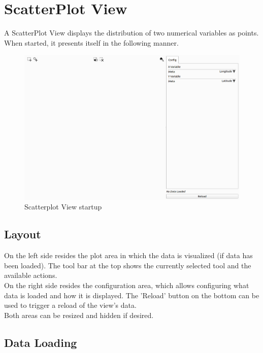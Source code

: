 \chapter{ScatterPlot View}
\label{sec:scatter_view}

A ScatterPlot View displays the distribution of two numerical variables as points. When started, it presents itself in the following manner.

\begin{figure}[H]
    \hspace*{-2cm}
    \includegraphics[width=18cm,frame]{figures/scatter_start.png}
  \caption{Scatterplot View startup}
\end{figure}

\section{Layout}

On the left side resides the plot area in which the data is visualized (if data has been loaded). The tool bar at the top shows the currently selected tool and the available actions.\\

On the right side resides the configuration area, which allows configuring what data is loaded and how it is displayed. The 'Reload' button on the bottom can be used to trigger a reload of the view's data.\\

Both areas can be resized and hidden if desired.

\section{Data Loading}

